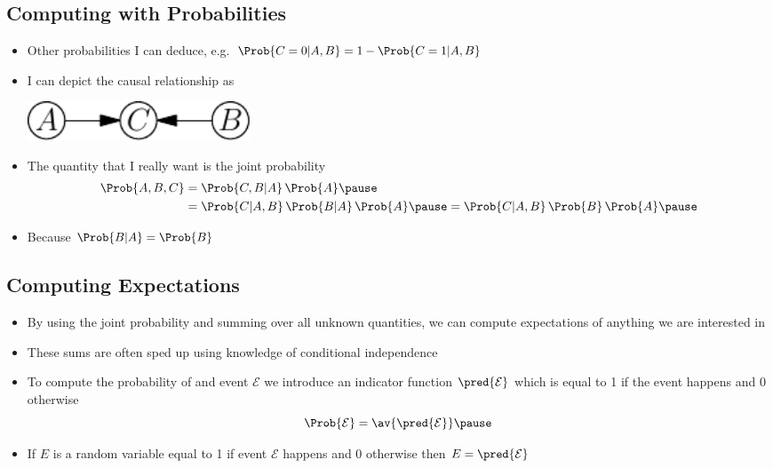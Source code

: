 \begin{slide}
\section{Computing with Probabilities}

\begin{PauseHighLight}
  \begin{itemize}
  \item Other probabilities I can deduce,
    e.g. \(\Prob{C=0|A,B}=1-\Prob{C=1|A,B}\)\pause
  \item I can depict the causal relationship as
    \begin{center}
      \includegraphics[width=0.3\textwidth]{figures/acb.pdf}\pause
    \end{center}
  \item The quantity that I really want is the joint probability
    \begin{align*}
      \Prob{A,B,C} &= \Prob{C,B|A}\,\Prob{A} \pause\\
                   &= \Prob{C|A,B}\,\Prob{B|A}\,\Prob{A}\pause
                    = \Prob{C|A,B}\,\Prob{B}\,\Prob{A}\pause
    \end{align*}
  \item Because \(\Prob{B|A}=\Prob{B}\)\pause
  \end{itemize}
\end{PauseHighLight}

\end{slide}


\begin{slide}
\section{Computing Expectations}

\begin{PauseHighLight}
  \begin{itemize}
  \item By using the joint probability and summing over all unknown
    quantities, we can compute expectations of anything we are
    interested in\pause
  \item These sums are often sped up using knowledge of conditional
    independence\pause
  \item To compute the probability of and event $\mathcal{E}$ we
    introduce an indicator function $\pred{\mathcal{E}}$ which is
    equal to 1 if the event happens and 0 otherwise
    $$ \Prob{\mathcal{E}} = \av{\pred{\mathcal{E}}} \pause $$
  \item If $E$ is a random variable equal to 1 if event $\mathcal{E}$
    happens and 0 otherwise then $E = \pred{\mathcal{E}}$\pause
  \end{itemize}
\end{PauseHighLight}

\end{slide}

